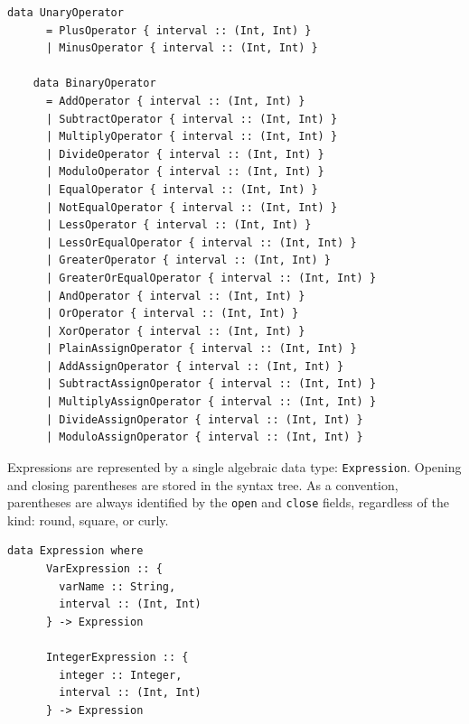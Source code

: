 \documentclass[UdineBachThesis,american,11pt]{PhdThesis}
\begin{document}
  \begin{Verbatim}[gobble=4,fontsize=\small]
    data UnaryOperator
      = PlusOperator { interval :: (Int, Int) }
      | MinusOperator { interval :: (Int, Int) }

    data BinaryOperator
      = AddOperator { interval :: (Int, Int) }
      | SubtractOperator { interval :: (Int, Int) }
      | MultiplyOperator { interval :: (Int, Int) }
      | DivideOperator { interval :: (Int, Int) }
      | ModuloOperator { interval :: (Int, Int) }
      | EqualOperator { interval :: (Int, Int) }
      | NotEqualOperator { interval :: (Int, Int) }
      | LessOperator { interval :: (Int, Int) }
      | LessOrEqualOperator { interval :: (Int, Int) }
      | GreaterOperator { interval :: (Int, Int) }
      | GreaterOrEqualOperator { interval :: (Int, Int) }
      | AndOperator { interval :: (Int, Int) }
      | OrOperator { interval :: (Int, Int) }
      | XorOperator { interval :: (Int, Int) }
      | PlainAssignOperator { interval :: (Int, Int) }
      | AddAssignOperator { interval :: (Int, Int) }
      | SubtractAssignOperator { interval :: (Int, Int) }
      | MultiplyAssignOperator { interval :: (Int, Int) }
      | DivideAssignOperator { interval :: (Int, Int) }
      | ModuloAssignOperator { interval :: (Int, Int) }
  \end{Verbatim}

  Expressions are represented by a single algebraic data type:
  \mbox{\texttt{Expression}}. Opening and closing parentheses are stored in the
  syntax tree. As a convention, parentheses are always identified by the
  \mbox{\texttt{open}} and \mbox{\texttt{close}} fields, regardless of the kind:
  round, square, or curly.

  \begin{Verbatim}[gobble=4,fontsize=\small]
    data Expression where
      VarExpression :: {
        varName :: String,
        interval :: (Int, Int)
      } -> Expression

      IntegerExpression :: {
        integer :: Integer,
        interval :: (Int, Int)
      } -> Expression
  \end{Verbatim}

  \pagebreak
\end{document}
